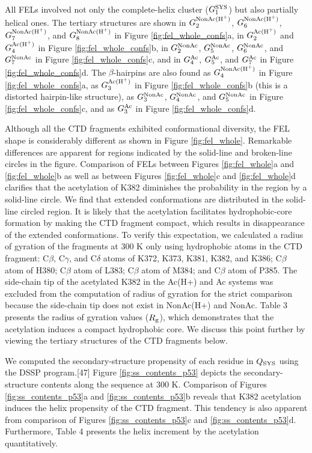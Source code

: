 All FELs involved not only the complete-helix cluster ($G^{\rm SYS}_1$) but also partially helical ones. The tertiary structures are shown in $G^{\rm NonAc(H^+)}_2$, $G^{\rm NonAc(H^+)}_6$, $G^{\rm NonAc(H^+)}_7$, and $G^{\rm NonAc(H^+)}_8$ in Figure \ref{fig:fel_whole_confs}a, in $G^{\rm Ac(H^+)}_2$ and $G^{\rm Ac(H^+)}_4$ in Figure \ref{fig:fel_whole_confs}b, in $G^{\rm NonAc}_2$, $G^{\rm NonAc}_5$, $G^{\rm NonAc}_6$, and $G^{\rm NonAc}_7$ in Figure \ref{fig:fel_whole_confs}c, and in $G^{\rm Ac}_4$, $G^{\rm Ac}_5$, and $G^{\rm Ac}_7$ in Figure \ref{fig:fel_whole_confs}d. The $\beta$-hairpins are also found as $G^{\rm NonAc(H^+)}_4$ in Figure \ref{fig:fel_whole_confs}a, as $G^{\rm Ac(H^+)}_3$ in Figure \ref{fig:fel_whole_confs}b (this is a distorted hairpin-like structure), as  $G^{\rm NonAc}_3$, $G^{\rm NonAc}_4$, and $G^{\rm NonAc}_5$ in Figure \ref{fig:fel_whole_confs}c, and as $G^{\rm Ac}_3$ in Figure \ref{fig:fel_whole_confs}d.

Although all the CTD fragments exhibited conformational diversity, the FEL shape is considerably different as shown in Figure \ref{fig:fel_whole}. Remarkable differences are apparent for regions indicated by the solid-line and broken-line circles in the figure. Comparison of FELs between Figures \ref{fig:fel_whole}a and \ref{fig:fel_whole}b as well as between Figures \ref{fig:fel_whole}c and \ref{fig:fel_whole}d clarifies that the acetylation of K382 diminishes the probability in the region by a solid-line circle. We find that extended conformations are distributed in the solid-line circled region. It is likely that the acetylation facilitates hydrophobic-core formation by making the CTD fragment compact, which results in disappearance of the extended conformations. To verify this expectation, we calculated a radius of gyration of the fragments at 300 K only using hydrophobic atoms in the CTD fragment: C$\beta$, C$\gamma$, and C$\delta$ atoms of K372, K373, K381, K382, and K386; C$\beta$ atom of H380; C$\beta$ atom of L383; C$\beta$ atom of M384; and C$\beta$ atom of P385. The side-chain tip of the acetylated K382 in the Ac(H+) and Ac systems was excluded from the computation of radius of gyration for the strict comparison because the side-chain tip does not exist in NonAc(H+) and NonAc. Table 3 presents the radius of gyration values ($R_{\rm g}$), which demonstrates that the acetylation induces a compact hydrophobic core. We discuss this point further by viewing the tertiary structures of the CTD fragments below.

We computed the secondary-structure propensity of each residue in $Q_{\rm SYS}$ using the DSSP program.[47] Figure \ref{fig:ss_contents_p53} depicts the secondary-structure contents along the sequence at 300 K. Comparison of Figures \ref{fig:ss_contents_p53}a and \ref{fig:ss_contents_p53}b reveals that K382 acetylation induces the helix propensity of the CTD fragment. This tendency is also apparent from comparison of Figures \ref{fig:ss_contents_p53}c and \ref{fig:ss_contents_p53}d. Furthermore, Table 4 presents the helix increment by the acetylation quantitatively.

